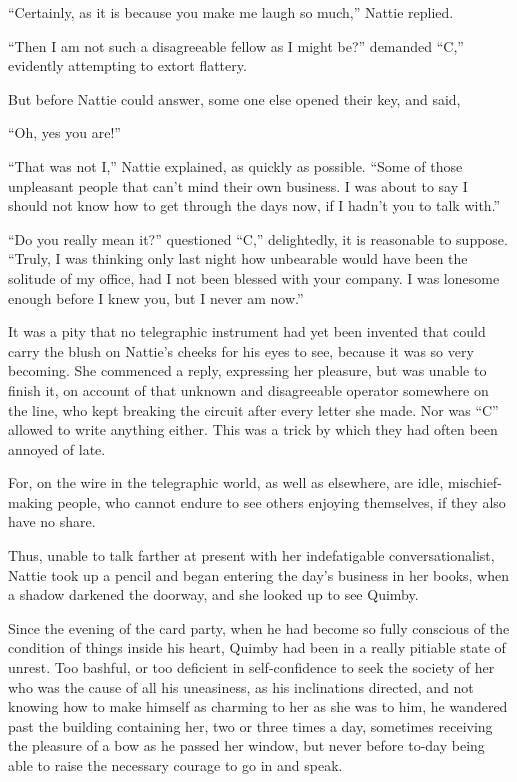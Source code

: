 ``Certainly, as it is because you make me laugh so much,'' Nattie replied.

``Then I am not such a disagreeable fellow as I might be?'' demanded ``C,''
evidently attempting to extort flattery.

But before Nattie could answer, some one else opened their key, and
said,

``Oh, yes you are!''

``That was not I,'' Nattie explained, as quickly as possible. ``Some of
those unpleasant people that can't mind their own business. I was about
to say I should not know how to get through the days now, if I hadn't
you to talk with.''

``Do you really mean it?'' questioned ``C,'' delightedly, it is reasonable
to suppose. ``Truly, I was thinking only last night how unbearable would
have been the solitude of my office, had I not been blessed with your
company. I was lonesome enough before I knew you, but I never am now.''

It was a pity that no telegraphic instrument had yet been invented that
could carry the blush on Nattie's cheeks for his eyes to see, because it
was so very becoming. She commenced a reply, expressing her pleasure,
but was unable to finish it, on account of that unknown and disagreeable
operator somewhere on the line, who kept breaking the circuit after
every letter she made. Nor was ``C'' allowed to write anything either.
This was a trick by which they had often been annoyed of late.

For, on the wire in the telegraphic world, as well as elsewhere, are
idle, mischief-making people, who cannot endure to see others enjoying
themselves, if they also have no share.

Thus, unable to talk farther at present with her indefatigable
conversationalist, Nattie took up a pencil and began entering the day's
business in her books, when a shadow darkened the doorway, and she
looked up to see Quimby.

Since the evening of the card party, when he had become so fully
conscious of the condition of things inside his heart, Quimby had been
in a really pitiable state of unrest. Too bashful, or too deficient in
self-confidence to seek the society of her who was the cause of all his
uneasiness, as his inclinations directed, and not knowing how to make
himself as charming to her as she was to him, he wandered past the
building containing her, two or three times a day, sometimes receiving
the pleasure of a bow as he passed her window, but never before to-day
being able to raise the necessary courage to go in and speak.

